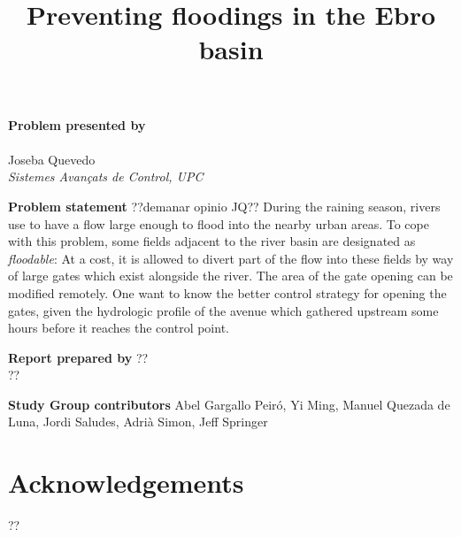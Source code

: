 \documentclass[a4paper,12pt,english]{article}
\title{Preventing floodings in the Ebro basin}
\begin{document}
\maketitle

\begin{center}
\textbf{Problem presented by} \\ \ \\ \large Joseba Quevedo \\ \normalsize \textit{Sistemes Avan{\c c}ats de Control, UPC}
\end{center}

\begin{center}
\textbf{Problem statement}
??demanar opinio JQ??
During the raining season, rivers use to have a flow large enough to flood into the
nearby urban areas. To cope with this problem, some fields adjacent to the river basin are designated as
\emph{floodable}: At a cost, it is allowed to divert part of the flow into these fields by way of large gates which exist alongside the river. The area of the gate opening can be modified remotely.
One want to know the better control strategy for opening the gates, given the hydrologic profile
of the avenue which gathered upstream some hours before it reaches the control point.
\end{center}



\begin{center}
\textbf{Report prepared by} ?? \\ ??
\end{center}


\begin{center}
\textbf{Study Group contributors}
Abel Gargallo Peiró,
Yi Ming,
Manuel Quezada de Luna,
Jordi Saludes,
Adrià Simon,
Jeff Springer
\end{center}

\newpage


\section*{Acknowledgements}
??

\begin{thebibliography}{99}
\end{thebibliography}
\end{document}
